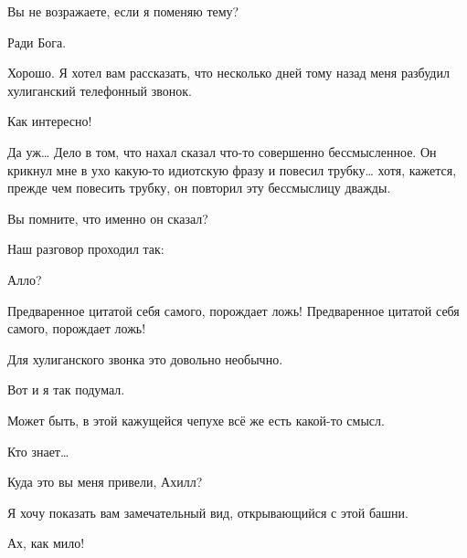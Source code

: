 \documentclass[../main.tex]{subfiles}
\begin{document}


\begin{Dialogue}

 Вы не возражаете, если я поменяю тему?

 Ради Бога.

 Хорошо. Я хотел вам рассказать, что несколько дней тому назад меня разбудил хулиганский телефонный звонок.

 Как интересно!

 Да уж\ldots{} Дело в том, что нахал сказал что-то совершенно бессмысленное. Он крикнул мне в ухо какую-то идиотскую фразу и повесил трубку\ldots{} хотя, кажется, прежде чем повесить трубку, он повторил эту бессмыслицу дважды.

 Вы помните, что именно он сказал?

 Наш разговор проходил так:

\begin{sublevel}

 Алло?

 Предваренное цитатой себя самого, порождает ложь! Предваренное цитатой себя самого, порождает ложь!


\end{sublevel}

 Для хулиганского звонка это довольно необычно.

 Вот и я так подумал.

 Может быть, в этой кажущейся чепухе всё же есть какой-то смысл.

 Кто знает\ldots{}


 Куда это вы меня привели, Ахилл?

 Я хочу показать вам замечательный вид, открывающийся с этой башни.

 Ах, как мило!


\end{Dialogue}
\end{document}
